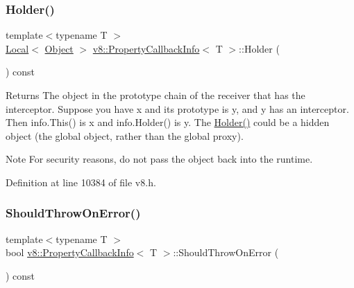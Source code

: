 \subsubsection{\texorpdfstring{Holder()}{Holder()}}
{\footnotesize\ttfamily template$<$typename T $>$ \\
\mbox{\hyperlink{classv8_1_1Local}{Local}}$<$ \mbox{\hyperlink{classv8_1_1Object}{Object}} $>$ \mbox{\hyperlink{classv8_1_1PropertyCallbackInfo}{v8\+::\+Property\+Callback\+Info}}$<$ T $>$\+::Holder (\begin{DoxyParamCaption}{ }\end{DoxyParamCaption}) const}

\begin{DoxyReturn}{Returns}
The object in the prototype chain of the receiver that has the interceptor. Suppose you have {\ttfamily x} and its prototype is {\ttfamily y}, and {\ttfamily y} has an interceptor. Then {\ttfamily info.\+This()} is {\ttfamily x} and {\ttfamily info.\+Holder()} is {\ttfamily y}. The \mbox{\hyperlink{classv8_1_1PropertyCallbackInfo_a66b7ec267f18bd84e8baf0a0e16187b9}{Holder()}} could be a hidden object (the global object, rather than the global proxy).
\end{DoxyReturn}
\begin{DoxyNote}{Note}
For security reasons, do not pass the object back into the runtime. 
\end{DoxyNote}


Definition at line 10384 of file v8.\+h.

\mbox{\label{classv8_1_1PropertyCallbackInfo_a82d79a9cdaac9807a0fa17331b159ce9}} 
\subsubsection{\texorpdfstring{Should\+Throw\+On\+Error()}{ShouldThrowOnError()}}
{\footnotesize\ttfamily template$<$typename T $>$ \\
bool \mbox{\hyperlink{classv8_1_1PropertyCallbackInfo}{v8\+::\+Property\+Callback\+Info}}$<$ T $>$\+::Should\+Throw\+On\+Error (\begin{DoxyParamCaption}{ }\end{DoxyParamCaption}) const}

